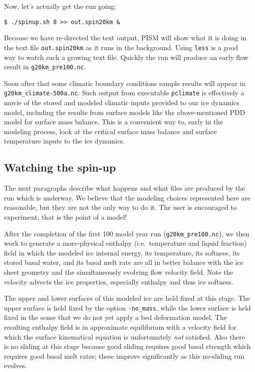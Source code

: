 Now, let's actually get the run going:
\begin{verbatim}
$ ./spinup.sh 8 >> out.spin20km &
\end{verbatim}
\noindent Because we have re-directed the text output, PISM will show what it is doing in the text file \texttt{out.spin20km} as it runs in the background.  Using \texttt{less} is a good way to watch such a growing text file.  Quickly the run will produce an early flow result in \texttt{g20km_pre100.nc}.

Soon after that some climatic boundary conditions sample results will appear in \texttt{g20km_climate-500a.nc}.  Such output from executable \texttt{pclimate} is effectively a movie of the stored and modeled climatic inputs provided to our ice dynamics model, including the results from surface models like the above-mentioned PDD model for surface mass balance.  This is a convenient way to, early in the modeling process, look at the critical surface mass balance and surface temperature inputs to the ice dynamics.


\subsection{Watching the spin-up}  \label{subsect:spinupsketch}  The next paragraphs describe what happens and what files are produced by the run which is underway.  We believe that the modeling choices represented here are reasonable, but they are not the only way to do it.  The user is encouraged to experiment; that is the point of a model!

After the completion of the first 100 model year run (\texttt{g20km_pre100.nc}), we then work to generate a more-physical enthalpy (i.e.~temperature and liquid fraction) field in which the modeled ice internal energy, its temperature, its softness, its stored basal water, and its basal melt rate are all in better balance with the ice sheet geometry and the simultaneously evolving flow velocity field.  Note the velocity advects the ice properties, especially enthalpy and thus ice softness.

The upper and lower surfaces of this modeled ice are held fixed at this stage.  The upper surface is held fixed by the option \texttt{-no_mass}, while the lower surface is held fixed in the sense that we do not yet apply a bed deformation model.  The resulting enthalpy field is in approximate equilibrium with a velocity field for which the surface kinematical equation \cite{Fowler} is unfortunately \emph{not} satisfied.  Also there is no sliding at this stage because good sliding requires good basal strength which requires good basal melt rates; these improve significantly as this no-sliding run evolves.


